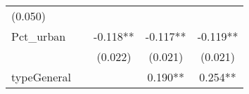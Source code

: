 \documentclass[12pt,twoside]{reedthesis}
\begin{document}
\begin{longtable}[]{@{}lcccc@{}}
\begin{minipage}[t]{0.14\columnwidth}
  (0.050)\strut
  \end{minipage}\tabularnewline
  \begin{minipage}[t]{0.26\columnwidth}\raggedright\strut
  Pct\_urban\strut
  \end{minipage} & \begin{minipage}[t]{0.12\columnwidth}\centering\strut
  \strut
  \end{minipage} & \begin{minipage}[t]{0.13\columnwidth}\centering\strut
  -0.118**\strut
  \end{minipage} & \begin{minipage}[t]{0.14\columnwidth}\centering\strut
  -0.117**\strut
  \end{minipage} & \begin{minipage}[t]{0.14\columnwidth}\centering\strut
  -0.119**\strut
  \end{minipage}\tabularnewline
  \begin{minipage}[t]{0.26\columnwidth}\raggedright\strut
  \strut
  \end{minipage} & \begin{minipage}[t]{0.12\columnwidth}\centering\strut
  \strut
  \end{minipage} & \begin{minipage}[t]{0.13\columnwidth}\centering\strut
  (0.022)\strut
  \end{minipage} & \begin{minipage}[t]{0.14\columnwidth}\centering\strut
  (0.021)\strut
  \end{minipage} & \begin{minipage}[t]{0.14\columnwidth}\centering\strut
  (0.021)\strut
  \end{minipage}\tabularnewline
  \begin{minipage}[t]{0.26\columnwidth}\raggedright\strut
  typeGeneral\strut
  \end{minipage} & \begin{minipage}[t]{0.12\columnwidth}\centering\strut
  \strut
  \end{minipage} & \begin{minipage}[t]{0.13\columnwidth}\centering\strut
  \strut
  \end{minipage} & \begin{minipage}[t]{0.14\columnwidth}\centering\strut
  0.190**\strut
  \end{minipage} & \begin{minipage}[t]{0.14\columnwidth}\centering\strut
  0.254**\strut
  \end{minipage}\tabularnewline

\end{longtable}
\end{document}
